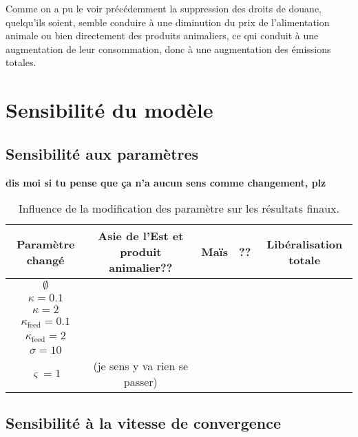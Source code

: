 Comme on a pu le voir précédemment la suppression des droits de douane, quelqu'ils soient, semble conduire à une diminution du prix de l'alimentation animale ou bien directement des produits animaliers, ce qui conduit à une augmentation de leur consommation, donc à une augmentation des émissions totales.


\section{Sensibilité du modèle}

\subsection{Sensibilité aux paramètres}

\textbf{dis moi si tu pense que ça n'a aucun sens comme changement, plz}
\begin{table}[hbt!]
    \centering
    \caption{Influence de la modification des paramètre sur les résultats finaux.}
    \label{tab:sensibilite_param}
    \begin{tabular}{c|cccc}
        \hline
        Paramètre changé           & Asie de l'Est et produit animalier?? & Maïs & ?? & Libéralisation totale \\ \hline
        $\emptyset$                &                                      &      &    &                       \\
        $\kappa = 0.1$             &                                      &      &    &                       \\
        $\kappa = 2$               &                                      &      &    &                       \\
        $\kappa_\text{feed} = 0.1$ &                                      &      &    &                       \\
        $\kappa_\text{feed} = 2$   &                                      &      &    &                       \\
        $\sigma = 10$              &                                      &      &    &                       \\
        $\varsigma = 1$            & (je sens y va rien se passer)                                            \\
    \end{tabular}%
\end{table}

\subsection{Sensibilité à la vitesse de convergence}\label{subsec:vit_cvg}

